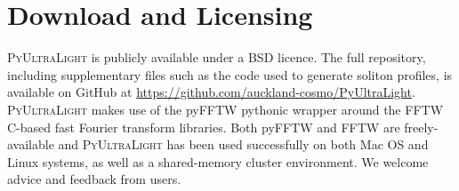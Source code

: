 \documentclass[a4paper,11pt]{article}
\newcommand{\PyUltraLight}{\textsc{PyUltraLight}\xspace}
\begin{document}
\appendix
\section{Download and Licensing}

\PyUltraLight is publicly available under a BSD licence. The full repository, including supplementary files such as the code used to generate soliton profiles, is available on GitHub at {\url{https://github.com/auckland-cosmo/PyUltraLight}}. \PyUltraLight makes use of the pyFFTW pythonic wrapper around the FFTW C-based fast Fourier transform libraries. Both pyFFTW and FFTW are freely-available and \PyUltraLight has been used successfully on both Mac OS and Linux systems, as well as a shared-memory cluster environment. We welcome advice and feedback from users. 









 








\end{document}

